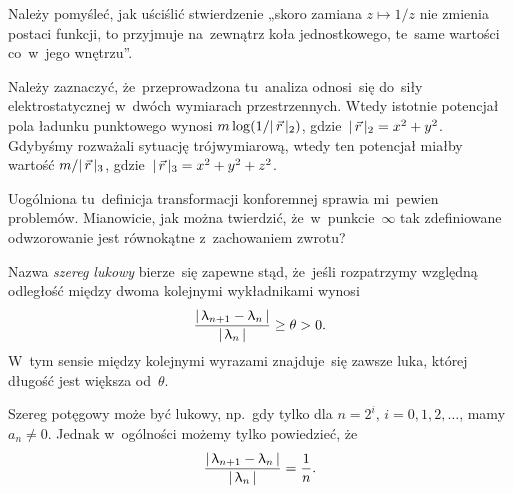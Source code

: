 \documentclass[a4paper,11pt]{article}
\begin{document}
\vspace{\spaceFour}





\noindent
{} Należy pomyśleć, jak uściślić stwierdzenie „skoro zamiana
$z \mapsto 1 / z$ nie zmienia postaci funkcji, to przyjmuje na~zewnątrz koła
jednostkowego, te~same wartości co~w~jego wnętrzu”.

\vspace{\spaceFour}





\noindent
{} Należy zaznaczyć, że~przeprowadzona tu~analiza odnosi~się
do~siły elektrostatycznej w~dwóch wymiarach przestrzennych. Wtedy istotnie
potencjał pola ładunku punktowego wynosi
$m \log( 1 / |\, {  \vec{ r }  } \,|_{ 2 } )$,
gdzie~$|\, {  \vec{ r }  } \,|_{ 2 } = x^{ 2 } + y^{ 2 }$. Gdybyśmy rozważali
sytuację trójwymiarową, wtedy ten potencjał miałby wartość
$m / |\, {  \vec{ r }  } \,|_{ 3 }$,
gdzie~$|\, {  \vec{ r }  } \,|_{ 3 } = x^{ 2 } + y^{ 2 } + z^{ 2 }$.

\vspace{\spaceFour}





\noindent
{} Uogólniona tu~definicja transformacji konforemnej sprawia
mi~pewien problemów. Mianowicie, jak można twierdzić, że~w~punkcie~$\infty$ tak
zdefiniowane odwzorowanie jest równokątne z~zachowaniem zwrotu?

\vspace{\spaceFour}





\noindent
{} Nazwa \textit{szereg lukowy} bierze~się zapewne stąd, że~jeśli
rozpatrzymy względną odległość między dwoma kolejnymi wykładnikami wynosi
\begin{equation}
  \label{eq:Leja-Funkcje-zespolone-49}
  \frac{ |\, {  \uplambda_{ n + 1 } - \uplambda_{ n }  } \,| }{ |\, {  \uplambda_{ n }  } \,| } \geq
  \theta > 0.
\end{equation}
W~tym sensie między kolejnymi wyrazami znajduje~się zawsze luka,
której długość jest większa od~$\theta$.

Szereg potęgowy może być lukowy, np.~gdy tylko dla $n = 2^{ i }$,
$i = 0, 1, 2, \ldots$, mamy $a_{ n } \neq 0$. Jednak w~ogólności możemy
tylko powiedzieć, że
\begin{equation}
  \label{eq:Leja-Funkcje-zespolone-50}
  \frac{ |\, {  \uplambda_{ n + 1 } - \uplambda_{ n }  } \,| }{ |\, {  \uplambda_{ n }  } \,| } =
  \frac{ 1 }{ n }.
\end{equation}
\end{document}
